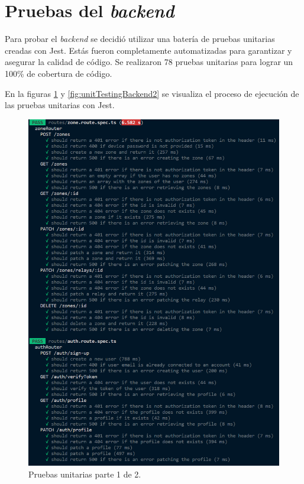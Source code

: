 \section{Pruebas del \emph{backend}}

Para probar el \textit{backend} se decidió utilizar una batería de pruebas unitarias creadas con Jest. Estás fueron completamente automatizadas para garantizar y asegurar la calidad de código. Se realizaron 78 pruebas unitarias para lograr un 100\% de cobertura de código. 

En la figuras \ref{fig:unitTestingBackend1} y \ref{fig:unitTestingBackend2} se visualiza el proceso de ejecución de las pruebas unitarias con Jest.

\begin{figure}[H]
	\centering
	\includegraphics[width=.9\textwidth]{./Figures/Backend unit testing.png}
	\caption{Pruebas unitarias parte 1 de 2.}
	\label{fig:unitTestingBackend1}
\end{figure}

